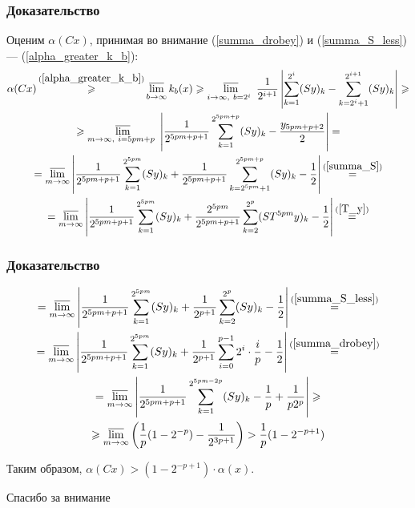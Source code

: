 \documentclass[10pt,pdf,hyperref={unicode}]{beamer}
\begin{document}
\begin{frame}\frametitle{Доказательство}
	Оценим $\alpha(Cx)$, принимая во внимание (\ref{summa_drobey}) и (\ref{summa_S_less}) --- (\ref{alpha_greater_k_b}):
	\begin{multline*}
		\alpha (Cx) \mathop{\geqslant}^{(\ref{alpha_greater_k_b})}
		\varlimsup_{b\to \infty} k_b(x) \geqslant
		\varlimsup_{
			i\to \infty,~
			b=2^i~
		}\frac{1}{2^{i+1}}\left|
			\sum_{k=1}^{2^i}(Sy)_k - \sum_{k=2^i+1}^{2^{i+1}}(Sy)_k
		\right| \geqslant
		\\ \geqslant
		\varlimsup_{
			m\to \infty,~
			i=5pm+p~
		}\left|
			\frac{1}{2^{5pm+p+1}}\sum_{k=1}^{2^{5pm+p}}(Sy)_k - \frac{y_{5pm+p+2}}{2}
		\right| =
		\\=
		\varlimsup_{m\to \infty}\left|
			\frac{1}{2^{5pm+p+1}}\sum_{k=1}^{2^{5pm}}(Sy)_k
			+
			\frac{1}{2^{5pm+p+1}}\sum_{k=2^{5pm}+1}^{2^{5pm+p}}(Sy)_k
			- \frac{1}{2}
		\right|
		\mathop{=}^{(\ref{summa_S})}
		\\=
		\varlimsup_{m\to \infty}\left|
			\frac{1}{2^{5pm+p+1}}\sum_{k=1}^{2^{5pm}}(Sy)_k
			+
			\frac{2^{5pm}}{2^{5pm+p+1}} \sum_{k=2}^{2^p}(ST^{5pm}y)_k
			- \frac{1}{2}
		\right|
		\mathop{=}^{(\ref{T_y})}
	\end{multline*}
\end{frame}
\begin{frame}\frametitle{Доказательство}
	\begin{multline*}
	=
	\varlimsup_{m\to \infty}\left|
		\frac{1}{2^{5pm+p+1}}\sum_{k=1}^{2^{5pm}}(Sy)_k
		+
		\frac{1}{2^{p+1}} \sum_{k=2}^{2^p}(Sy)_k
		- \frac{1}{2}
	\right|
	\mathop{=}^{(\ref{summa_S_less})}
	\\=
	\varlimsup_{m\to \infty}\left|
		\frac{1}{2^{5pm+p+1}}\sum_{k=1}^{2^{5pm}}(Sy)_k
		+
		\frac{1}{2^{p+1}} \sum_{i=0}^{p-1}2^i \cdot \frac{i}{p}
		- \frac{1}{2}
	\right|
	\mathop{=}^{(\ref{summa_drobey})}
	\\=
	\varlimsup_{m\to \infty}\left|
		\frac{1}{2^{5pm+p+1}}\sum_{k=1}^{2^{5pm-2p}}(Sy)_k
		-\frac{1}{p} + \frac{1}{p 2^p}
	\right| \geqslant
	\\ \geqslant
	\varlimsup_{m\to \infty} \left(
		\frac{1}{p} (1-2^{-p})
		- \frac{1}{2^{3p+1}}
	\right) >
	\frac{1}{p} (1-2^{-p+1})
\end{multline*}


Таким образом,
$
	\alpha(Cx) >
	(1-2^{-p+1}) \cdot \alpha(x)
$.

\end{frame}

\begin{frame}
	\huge\centering
	Спасибо за внимание
\end{frame}


\end{document}
